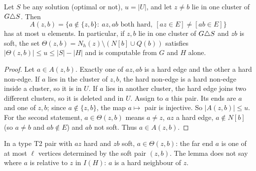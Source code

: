 \begin{lemma}\label{lem:near}
Let $S$ be any solution (optimal or not), $u=|U|$, and let $z\ne b$ lie in one cluster of $G\triangle S$. Then
\[
A(z,b)=\bigl\{a\notin\{z,b\}:\ az,ab\text{ both hard},\ [az\in E]\ne[ab\in E]\bigr\}
\]
has at most $u$ elements. In particular, if $z,b$ lie in one cluster of $G\triangle S$ and $zb$ is soft, the set $\Theta(z,b)=N_h(z)\setminus(N[b]\cup Q(b))$ satisfies $|\Theta(z,b)|\le u\le|S|-|H|$ and is computable from $G$ and $H$ alone.
\end{lemma}
\begin{proof}
Let $a\in A(z,b)$. Exactly one of $az,ab$ is a hard edge and the other a hard non-edge. If $a$ lies in the cluster of $z,b$, the hard non-edge is a hard non-edge inside a cluster, so it is in $U$. If $a$ lies in another cluster, the hard edge joins two different clusters, so it is deleted and in $U$. Assign to $a$ this pair. Its ends are $a$ and one of $z,b$; since $a\notin\{z,b\}$, the map $a\mapsto$ pair is injective. So $|A(z,b)|\le u$. For the second statement, $a\in\Theta(z,b)$ means $a\ne z$, $az$ a hard edge, $a\notin N[b]$ (so $a\ne b$ and $ab\notin E$) and $ab$ not soft. Thus $a\in A(z,b)$.
\end{proof}
In a type T2 pair with $az$ hard and $zb$ soft, $a\in\Theta(z,b)$: the far end $a$ is one of at most $\ell$ vertices determined by the soft pair $(z,b)$. The lemma does not say where $a$ is relative to $z$ in $I(H)$: $a$ is a hard neighbour of $z$.


